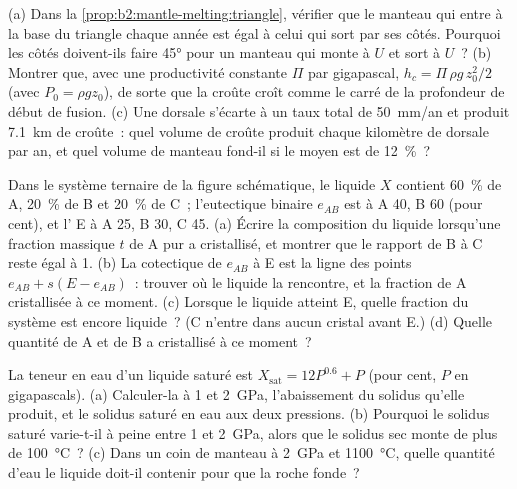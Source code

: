 \begin{exercise}[$\star\star\star$]\label{exo:b2:mantle-melting:10}
(a) Dans la \cref{prop:b2:mantle-melting:triangle}, vérifier que le manteau qui entre à la
base du triangle chaque année est égal à celui qui sort par ses côtés. Pourquoi les côtés doivent-ils
faire \ang{45} pour un manteau qui monte à $U$ et sort à $U$~?
(b) Montrer que, avec une productivité constante $\Pi$ par gigapascal, $h_c = \Pi\,\rho
g\,z_0^2/2$ (avec $P_0 = \rho g z_0$), de sorte que la croûte croît comme le carré de la
profondeur de début de fusion. (c) Une dorsale s'écarte à un taux total de \qty{50}{mm/an} et
produit \qty{7.1}{km} de croûte~: quel volume de croûte produit chaque kilomètre de dorsale
par an, et quel volume de manteau fond-il si le  moyen est de
\qty{12}{\percent}~?
\end{exercise}

\begin{exercise}[$\star\star\star$]\label{exo:b2:mantle-melting:11}
Dans le système ternaire de la figure schématique, le liquide $X$ contient
\qty{60}{\percent} de A, \qty{20}{\percent} de B et \qty{20}{\percent} de C~; l'eutectique binaire
$e_{AB}$ est à A 40, B 60 (pour cent), et l' E à
A 25, B 30, C 45. (a) Écrire la composition du liquide lorsqu'une fraction massique $t$
de A pur a cristallisé, et montrer que le rapport de B à C reste égal à 1. (b) La
cotectique de $e_{AB}$ à E est la ligne des points $e_{AB} + s(E - e_{AB})$~: trouver
où le liquide la rencontre, et la fraction de A cristallisée à ce moment. (c) Lorsque
le liquide atteint E, quelle fraction du système est encore liquide~? (C n'entre dans aucun
cristal avant E.) (d) Quelle quantité de A et de B a cristallisé à ce moment~?
\end{exercise}

\begin{exercise}[$\star\star\star$]\label{exo:b2:mantle-melting:12}
La teneur en eau d'un liquide saturé est $X_{\mathrm{sat}} = 12P^{0.6} + P$
(pour cent, $P$ en gigapascals). (a) Calculer-la à 1 et \qty{2}{GPa}, l'abaissement du solidus
qu'elle produit, et le solidus saturé en eau aux deux pressions. (b) Pourquoi le solidus saturé
varie-t-il à peine entre 1 et \qty{2}{GPa}, alors que le solidus sec monte de plus de
\qty{100}{\celsius}~? (c) Dans un coin de manteau à \qty{2}{GPa} et
\qty{1100}{\celsius}, quelle quantité d'eau le liquide doit-il contenir pour que la roche fonde~?
\end{exercise}

